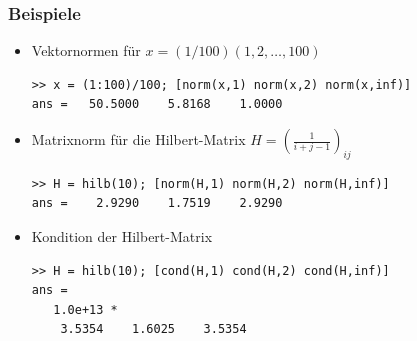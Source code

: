 % 
%
\begin{frame}[fragile]\frametitle{Beispiele}
\begin{itemize}
\item Vektornormen für $x=(1/100) (1, 2, \dots, 100)$
\begin{lstlisting}
>> x = (1:100)/100; [norm(x,1) norm(x,2) norm(x,inf)]
ans =   50.5000    5.8168    1.0000
\end{lstlisting}
\item Matrixnorm für die Hilbert-Matrix $H=(\frac{1}{i+j-1})_{ij}$
\begin{lstlisting}
>> H = hilb(10); [norm(H,1) norm(H,2) norm(H,inf)]
ans =    2.9290    1.7519    2.9290
\end{lstlisting}
\item Kondition der Hilbert-Matrix
\begin{lstlisting}
>> H = hilb(10); [cond(H,1) cond(H,2) cond(H,inf)]
ans =
   1.0e+13 *
    3.5354    1.6025    3.5354
\end{lstlisting}
\end{itemize}
\end{frame}

